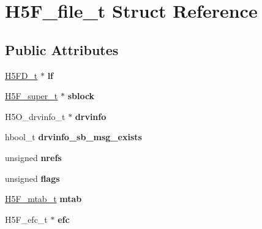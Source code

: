 \hypertarget{struct_h5_f__file__t}{}\section{H5\+F\+\_\+file\+\_\+t Struct Reference}
\label{struct_h5_f__file__t}
\subsection*{Public Attributes}
\begin{DoxyCompactItemize}
\item 
\mbox{\label{struct_h5_f__file__t_ae053967fd738fa3adbc8d4ddf45d2884}} 
\hyperlink{struct_h5_f_d__t}{H5\+F\+D\+\_\+t} $\ast$ {\bfseries lf}
\item 
\mbox{\label{struct_h5_f__file__t_ac0fd40839796d053464e0a48689a07a1}} 
\hyperlink{struct_h5_f__super__t}{H5\+F\+\_\+super\+\_\+t} $\ast$ {\bfseries sblock}
\item 
\mbox{\label{struct_h5_f__file__t_a5f333461a5fdc9594b713afd3a62cf67}} 
H5\+O\+\_\+drvinfo\+\_\+t $\ast$ {\bfseries drvinfo}
\item 
\mbox{\label{struct_h5_f__file__t_a6909358d0bbd409f9eb4e44bce2e4556}} 
hbool\+\_\+t {\bfseries drvinfo\+\_\+sb\+\_\+msg\+\_\+exists}
\item 
\mbox{\label{struct_h5_f__file__t_ace7b6eaad8b65a1b535993e6e3711a68}} 
unsigned {\bfseries nrefs}
\item 
\mbox{\label{struct_h5_f__file__t_a512d52c38abbe07889bfcf481c7962de}} 
unsigned {\bfseries flags}
\item 
\mbox{\label{struct_h5_f__file__t_a22e8317cb005a8dbcc42c4af4782117b}} 
\hyperlink{struct_h5_f__mtab__t}{H5\+F\+\_\+mtab\+\_\+t} {\bfseries mtab}
\item 
\mbox{\label{struct_h5_f__file__t_acee38c4a79c159fab1065319177795c5}} 
H5\+F\+\_\+efc\+\_\+t $\ast$ {\bfseries efc}
\item 
\mbox{\label{struct_h5_f__file__t_aff01a2a62195ac8124249726828e1e2a}} 

\end{DoxyCompactItemize}
